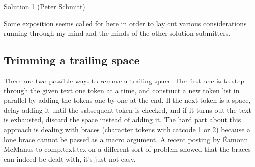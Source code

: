 \begin{solution}{Solution 1 (Peter Schmitt)}

\end{solution}

\begin{comment}
Date: 23 Dec 1993 16:21:21 -0500 (EST)
From: Michael Downes <MJD@MATH.AMS.ORG>
Subject: Around the Bend #15, answers, 2nd installment
To: info-tex@shsu.edu
X-ListName: TeX-Related Network Discussion List <INFO-TeX@SHSU.edu>
\end{comment}

Some exposition seems called for here in order to lay out various
considerations running through my mind and the minds of the other
solution-submitters.


\subsection{Trimming a trailing space}

There are two possible ways to remove a trailing space. The first one
is to step through the given text one token at a time, and construct a
new token list in parallel by adding the tokens one by one at the end.
If the next token is a space, delay adding it until the subsequent
token is checked, and if it turns out the text is exhausted, discard
the space instead of adding it. The hard part about this approach is
dealing with braces (character tokens with catcode 1 or 2) because a
lone brace cannot be passed as a macro argument. A recent posting by
\'Eamonn McManus to comp.text.tex on a different sort of problem
showed that the braces can indeed be dealt with, it's just not easy.

